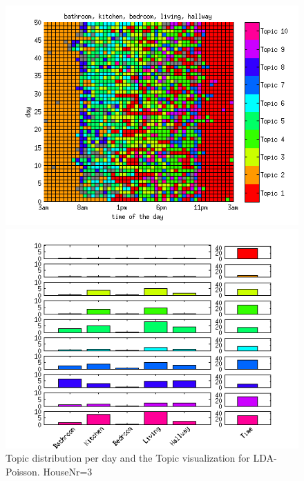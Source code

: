 \begin{figure}
 \centering
 \begin{minipage}[b]{0.45\linewidth}
  \centering
  \includegraphics[width=\textwidth]{Pictures/Pois/DayHN3TS48k20.png}
 \end{minipage}
 \begin{minipage}[b]{0.45\linewidth}
  \centering
  \includegraphics[width=\textwidth]{Pictures/Pois/TopHN3TS48k20.png}
 \end{minipage}
 \caption{Topic distribution per day and the Topic visualization for LDA-Poisson. HouseNr=3}
\end{figure}

